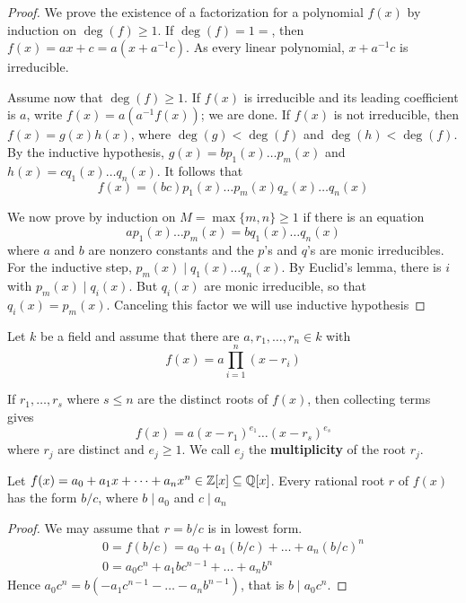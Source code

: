 \documentclass[11pt]{article}
\begin{document}
\begin{proof}
We prove the existence of a factorization for a polynomial \(f(x)\) by
induction on \(\deg(f)\ge1\). If \(\deg(f)=1=\), then \(f(x)=ax+c=a(x+a^{-1}c)\).
As every linear polynomial, \(x+a^{-1}c\) is irreducible.

Assume now that \(\deg(f)\ge1\). If \(f(x)\) is irreducible and its leading
coefficient is \(a\), write \(f(x)=a(a^{-1}f(x))\); we are done. If \(f(x)\) is not
irreducible, then \(f(x)=g(x)h(x)\), where \(\deg(g)<\deg(f)\) and
\(\deg(h)<\deg(f)\). By the inductive hypothesis, 
\(g(x)=bp_1(x)\dots p_m(x)\) and \(h(x)=cq_1(x)\dots q_n(x)\). It follows
that 
\begin{equation*}
f(x)=(bc)p_1(x)\dots p_m(x)q_x(x)\dots q_n(x)
\end{equation*}

We now prove by induction on \(M=\max\{m,n\}\ge1\) if there is an
equation
\begin{equation*}
ap_1(x)\dots p_m(x)=bq_1(x)\dots q_n(x)
\end{equation*}
where \(a\) and \(b\) are nonzero constants and the \(p\)'s and \(q\)'s are monic
irreducibles. For the inductive step, \(p_m(x)\mid q_1(x)\dots q_n(x)\). By
Euclid's lemma, there is \(i\) with \(p_m(x)\mid q_i(x)\). But \(q_i(x)\) are
monic irreducible, so that \(q_i(x)=p_m(x)\). Canceling this factor we will use
inductive hypothesis
\end{proof}

Let \(k\) be a field and assume that there are \(a,r_1,\dots,r_n\in k\) with
\begin{equation*}
f(x)=a \displaystyle\prod_{i=1}^n(x-r_i)
\end{equation*}

If \(r_1,\dots,r_s\) where \(s\le n\) are the distinct roots of \(f(x)\), then
collecting terms gives
\begin{equation*}
f(x)=a(x-r_1)^{e_1}\dots (x-r_s)^{e_s}
\end{equation*}
where \(r_j\) are distinct and \(e_j\ge1\). We call \(e_j\) the \textbf{multiplicity} of the
root \(r_j\). 

\begin{theorem}[]
\label{thm3.43}
Let \(f(x)=a_0+a_1x+\dots+a_nx^n\in\mathbb{Z}[x]\subseteq\mathbb{Q}[x]\). Every rational root
\(r\) of \(f(x)\) has the form \(b/c\), where \(b\mid a_0\) and \(c\mid a_n\)
\end{theorem}

\begin{proof}
We may assume that \(r=b/c\) is in lowest form. 
\begin{gather*}
0=f(b/c)=a_0+a_1(b/c)+\dots+a_n(b/c)^n\\
0=a_0c^n+a_1bc^{n-1}+\dots+a_nb^n
\end{gather*}
Hence \(a_0c^n=b(-a_1c^{n-1}-\dots-a_nb^{n-1})\), that is \(b\mid a_0c^n\).
\end{proof}
\end{document}
